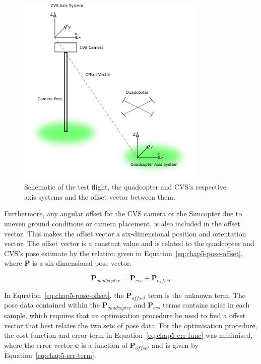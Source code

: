 \begin{figure}
  \centering
  \includegraphics[width=0.8\textwidth]{figures/chapter5/test_flight_schem}
  \caption[Shematic of the test flight layout.]{Schematic of the test flight, the quadcopter and CVS's respective axis systems and the offset vector between them.}
\label{fig:chap5-flight-test-schem}
\end{figure}

Furthermore, any angular offset for the CVS camera or the Suncopter due to uneven ground conditions or camera placement, is also included in the offset vector. This makes the offset vector a six-dimensional position and orientation vector. The offset vector is a constant value and is related to the quadcopter and CVS's pose estimate by the relation given in Equation~\ref{eq:chap5-pose-offset}, where $\bm{P}$ is a six-dimensional pose vector. 

\begin{equation}
  \label{eq:chap5-pose-offset}
  \bm{P}_{quadcopter} = \bm{P}_{cvs} + \bm{P}_{of\!fset}
\end{equation}

In Equation~\ref{eq:chap5-pose-offset}, the $\bm{P}_{of\!fset}$ term is the unknown term. The pose data contained within the $\bm{P}_{quadcopter}$ and $\bm{P}_{cvs}$ terms contains noise in each sample, which requires that an optimisation procedure be used to find a offset vector that best relates the two sets of pose data. For the optimisation procedure, the cost function and error term in Equation~\ref{eq:chap5-err-func} was minimised, where the error vector $\bm{e}$ is a function of $\bm{P}_{of\!fset}$ and is given by Equation~\ref{eq:chap5-err-term}. 

